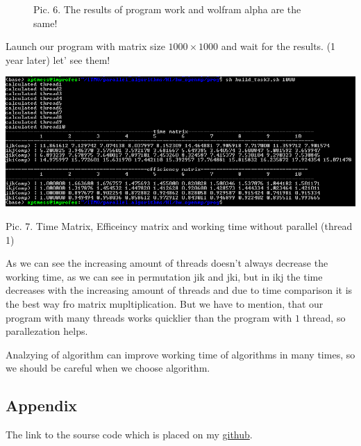 \documentclass[%
12pt, %
final, %
oneside, %
onecolumn, %
centertags]{article} %
\theoremstyle{plain}
\theoremstyle{definition}
\theoremstyle{remark}
\begin{document}
\begin{figure}[h!]
    \centering

    Pic. 6. The results of program work and wolfram alpha are the same!
\end{figure}

Launch our program with matrix size $1000 \times 1000$ and wait for the results. (1 year later) let' see them!

\begin{center}
\includegraphics[scale=0.65]{df_3.png}

Pic. 7. Time Matrix, Efficeincy matrix and working time without parallel (thread 1)
\end{center}

As we can see the increasing amount of threads doesn't always decrease the working time, as we can see in permutation jik and jki, but in ikj the time decreases with the increasing amount of threads and due to time comparison it is the best way fro matrix mupltiplication. But we have to mention, that our program with many threads works quicklier than the program with $1$ thread, so parallezation helps.

Analzying of algorithm can improve working time of algorithms in many times, so we should be careful when we choose algorithm.

\subsection{Appendix}

The link to the sourse code which is placed on my \href{https://github.com/aptmess/parallel_algorithms}{github}.
\end{document}
